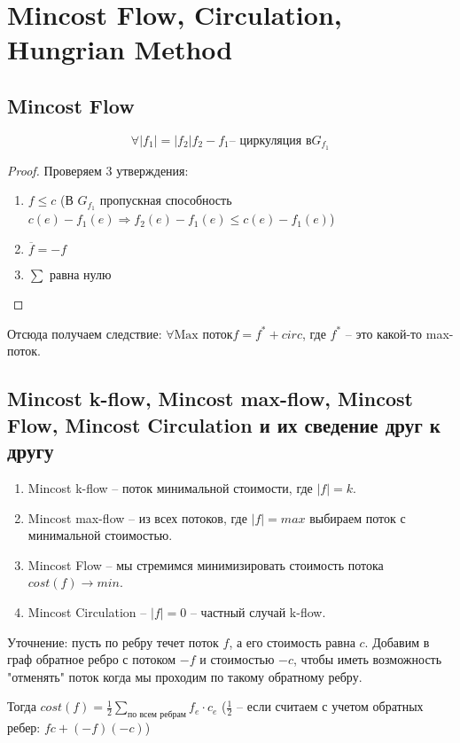 ﻿\section{Mincost Flow, Circulation, Hungrian Method}

\subsection{Mincost Flow}
\begin{lemma}
	\[ 
		\forall |f_1|=|f_2| f_2 - f_1 \text{-- циркуляция в} G_{f_1}
	\]
\end{lemma}
\begin{proof}
	Проверяем 3 утверждения:
	\begin{enumerate}
		\item $f \le c$  (В $G_{f_1}$ пропускная способность $c(e) - f_1(e) \Rightarrow f_2(e) - f_1(e) \le c(e) - f_1(e)$)
		\item $\overline{f} = -f$
		\item $\sum$ равна нулю
	\end{enumerate}
\end{proof}

Отсюда получаем следствие: $\forall \text{Max поток} f = f^* + circ$, где $f^*$ -- это какой-то max-поток.


\subsection{Mincost k-flow, Mincost max-flow, Mincost Flow, Mincost Circulation и их сведение друг к другу}
	\begin{enumerate}
		\item Mincost k-flow -- поток минимальной стоимости, где $|f| = k$.
		\item Mincost max-flow -- из всех потоков, где $|f| = max$ выбираем поток с минимальной стоимостью.
		\item Mincost Flow -- мы стремимся минимизировать стоимость потока $cost(f) \to min$.
		\item Mincost Circulation -- $|f| = 0$ -- частный случай k-flow. 
	\end{enumerate}	

Уточнение: пусть по ребру течет поток $f$, а его стоимость равна $c$. Добавим в граф обратное ребро с потоком $-f$ и стоимостью $-c$, чтобы иметь возможность "отменять" поток когда мы проходим по такому обратному ребру.

Тогда $cost(f) = \frac{1}{2}\sum_{\text {по всем ребрам}} f_e\cdot c_e$ ($\frac{1}{2}$ -- если считаем с учетом обратных ребер: $fc + (-f)(-c)$)

